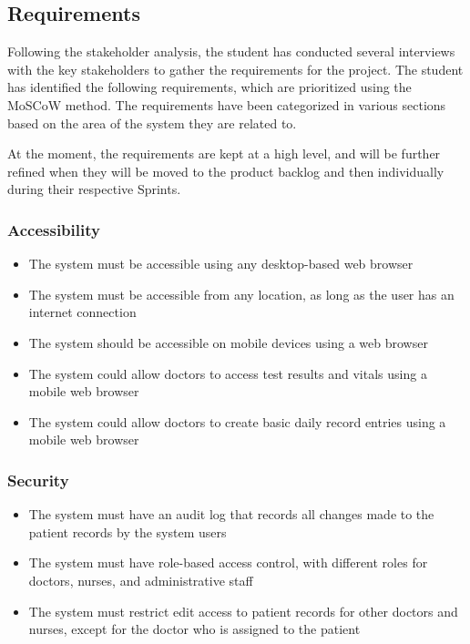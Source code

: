 \subsection{Requirements}

Following the stakeholder analysis, the student has conducted several interviews with the key stakeholders to gather the requirements for the project. The student has identified the following requirements, which are prioritized using the MoSCoW method. The requirements have been categorized in various sections based on the area of the system they are related to. 

At the moment, the requirements are kept at a high level, and will be further refined when they will be moved to the product backlog and then individually during their respective Sprints.

\subsubsection{Accessibility}
\begin{itemize}
    \item The system must be accessible using any desktop-based web browser
    \item The system must be accessible from any location, as long as the user has an internet connection
    \item The system should be accessible on mobile devices using a web browser
    \item The system could allow doctors to access test results and vitals using a mobile web browser
    \item The system could allow doctors to create basic daily record entries using a mobile web browser
\end{itemize}

\subsubsection{Security}
\begin{itemize}
    \item The system must have an audit log that records all changes made to the patient records by the system users
    \item The system must have role-based access control, with different roles for doctors, nurses, and administrative staff
    \item The system must restrict edit access to patient records for other doctors and nurses, except for the doctor who is assigned to the patient
\end{itemize}

